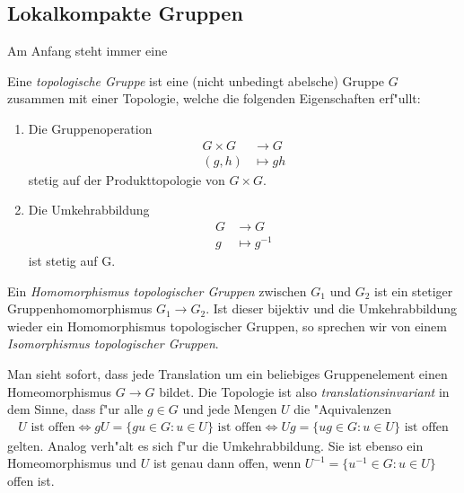 \subsection{Lokalkompakte Gruppen}
	Am Anfang steht immer eine
	\begin{defi}
		Eine \emph{topologische Gruppe} ist eine (nicht unbedingt abelsche) Gruppe $G$ zusammen mit einer Topologie, welche die folgenden Eigenschaften erf"ullt:
			\begin{enumerate}[label=(\roman*)] %
				\item Die Gruppenoperation
					\begin{align*}
						G \times G &\longrightarrow G\\
						(g,h) &\longmapsto gh
					\end{align*}
				stetig auf der Produkttopologie von $G \times G$.
				\item Die Umkehrabbildung
					\begin{align*}
						G &\longrightarrow G\\
						g &\longmapsto g^{-1}
					\end{align*}
					ist stetig auf G.
			\end{enumerate}
		Ein \emph{Homomorphismus topologischer Gruppen} zwischen $G_1$ und $G_2$ ist ein stetiger Gruppenhomomorphismus $G_1 \to G_2$.
		Ist dieser bijektiv und die Umkehrabbildung wieder ein Homomorphismus topologischer Gruppen, so sprechen wir von einem \emph{Isomorphismus topologischer Gruppen}.
	\end{defi}
	Man sieht sofort, dass jede Translation um ein beliebiges Gruppenelement einen Homeomorphismus $G \to G$ bildet.
	Die Topologie ist also \emph{translationsinvariant} in dem Sinne, dass f"ur alle $g \in G$ und jede Mengen $U$ die "Aquivalenzen
	\begin{align*}
		U \text{ ist offen} \Leftrightarrow gU = \{gu \in G: u\in U\} \text{ ist offen} \Leftrightarrow Ug = \{ug \in G: u\in U\} \text{ ist offen}
	\end{align*}
	gelten.
	Analog verh"alt es sich f"ur die Umkehrabbildung. 
	Sie ist ebenso ein Homeomorphismus und $U$ ist genau dann offen, wenn $U^{-1}=\{u^{-1}\in G: u \in U\}$ offen ist.
	
